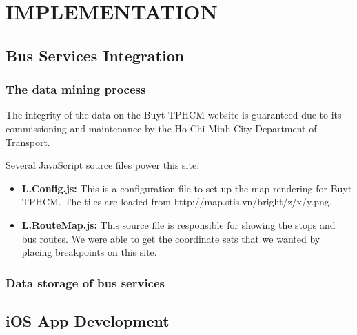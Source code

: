 %
%
\section{IMPLEMENTATION}

\subsection{Bus Services Integration}

\subsubsection{The data mining process}

The integrity of the data on the Buyt TPHCM website is guaranteed due to its commissioning and maintenance by the Ho Chi Minh City Department of Transport. 

Several JavaScript source files power this site:
\begin{itemize}
    \item \textbf{L.Config.js:} This is a configuration file to set up the map rendering for Buyt TPHCM. The tiles are loaded from http://map.stis.vn/bright/{z}/{x}/{y}.png.
    \item \textbf{L.RouteMap.js:} This source file is responsible for showing the stops and bus routes. We were able to get the coordinate sets that we wanted by placing breakpoints on this site.
\end{itemize}
\subsubsection{Data storage of bus services}

\subsection{iOS App Development}